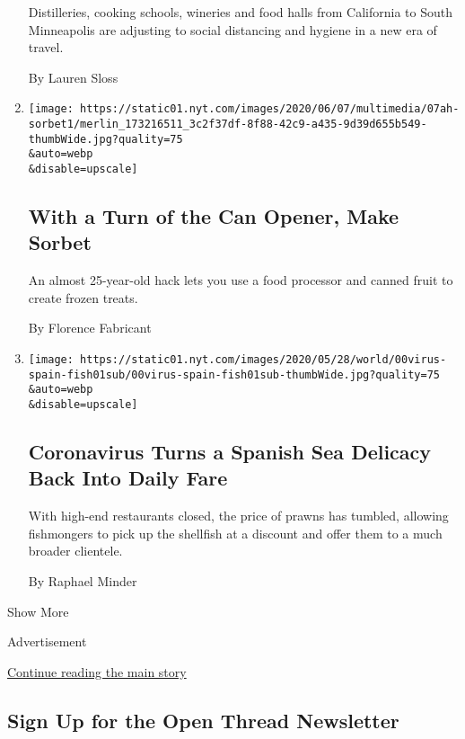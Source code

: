 \begin{enumerate}
  Distilleries, cooking schools, wineries and food halls from California
  to South Minneapolis are adjusting to social distancing and hygiene in
  a new era of travel.

  By Lauren Sloss
\item
  \href{/2020/06/05/at-home/how-to-make-sorbet.html}{}

  \texttt{[image: https://static01.nyt.com/images/2020/06/07/multimedia/07ah-sorbet1/merlin\_173216511\_3c2f37df-8f88-42c9-a435-9d39d655b549-thumbWide.jpg?quality=75\\\&auto=webp\\\&disable=upscale]}

  \hypertarget{with-a-turn-of-the-can-opener-make-sorbet}{%
  \subsection{With a Turn of the Can Opener, Make
  Sorbet}\label{with-a-turn-of-the-can-opener-make-sorbet}}

  An almost 25-year-old hack lets you use a food processor and canned
  fruit to create frozen treats.

  By Florence Fabricant
\item
  \href{/2020/05/31/world/europe/coronavirus-prawn-spain.html}{}

  \texttt{[image: https://static01.nyt.com/images/2020/05/28/world/00virus-spain-fish01sub/00virus-spain-fish01sub-thumbWide.jpg?quality=75\\\&auto=webp\\\&disable=upscale]}

  \hypertarget{coronavirus-turns-a-spanish-sea-delicacy-back-into-daily-fare}{%
  \subsection{Coronavirus Turns a Spanish Sea Delicacy Back Into Daily
  Fare}\label{coronavirus-turns-a-spanish-sea-delicacy-back-into-daily-fare}}

  With high-end restaurants closed, the price of prawns has tumbled,
  allowing fishmongers to pick up the shellfish at a discount and offer
  them to a much broader clientele.

  By Raphael Minder
\end{enumerate}

Show More

Advertisement

\protect\hyperlink{after-mid2}{Continue reading the main story}

\hypertarget{sign-up-for-the-open-thread-newsletter}{%
\subsection{Sign Up for the Open Thread
Newsletter}\label{sign-up-for-the-open-thread-newsletter}}


